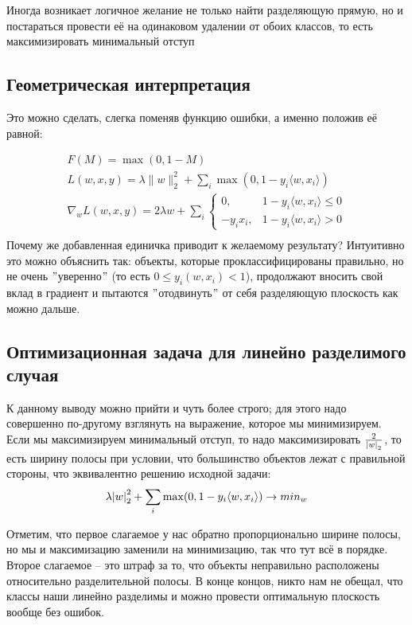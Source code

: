 Иногда возникает логичное желание не только найти разделяющую прямую, но и постараться провести её на одинаковом
удалении от обоих классов, то есть максимизировать минимальный отступ

\subsection{Геометрическая интерпретация}

Это можно сделать, слегка поменяв функцию ошибки, а именно положив её равной:

\begin{gather*}
    F(M) = \max(0, 1 - M)\\
    L(w, x, y) = \lambda \| w \|_2^2 + \sum_i \max(0, 1 - y_i \langle w, x_i \rangle)\\
    \nabla_w L(w, x, y) = 2\lambda w + \sum_i
    \begin{cases}
        0, & 1 - y_i \langle w, x_i \rangle \leq 0 \\
        -y_i x_i, & 1 - y_i \langle w, x_i \rangle > 0
    \end{cases} \\
\end{gather*}
Почему же добавленная единичка приводит к желаемому результату?
Интуитивно это можно объяснить так: объекты, которые проклассифицированы правильно, но не очень \("\)уверенно\("\)
(то есть $0 \leq y_i (w,x_i) < 1$), продолжают вносить свой вклад в градиент и пытаются \("\)отодвинуть\("\) от себя
разделяющую плоскость как можно дальше.

\subsection{Оптимизационная задача для линейно разделимого случая}

К данному выводу можно прийти и чуть более строго; для этого надо совершенно по-другому взглянуть на выражение,
которое мы минимизируем.
Если мы максимизируем минимальный отступ, то надо максимизировать $\frac{2}{\abs{w}_2}$, то есть ширину
полосы при условии, что большинство объектов лежат с правильной стороны, что эквивалентно решению исходной задачи:
\[ \lambda \abs{w}_2^2 + \sum_i \max(0, 1 - y_i \langle w, x_i \rangle) \rightarrow min_w \]

Отметим, что первое слагаемое у нас обратно пропорционально ширине полосы, но мы и максимизацию заменили на
минимизацию, так что тут всё в порядке.
Второе слагаемое -- это штраф за то, что объекты неправильно расположены относительно разделительной полосы.
В конце концов, никто нам не обещал, что классы наши линейно разделимы и можно провести оптимальную плоскость вообще
без ошибок.

